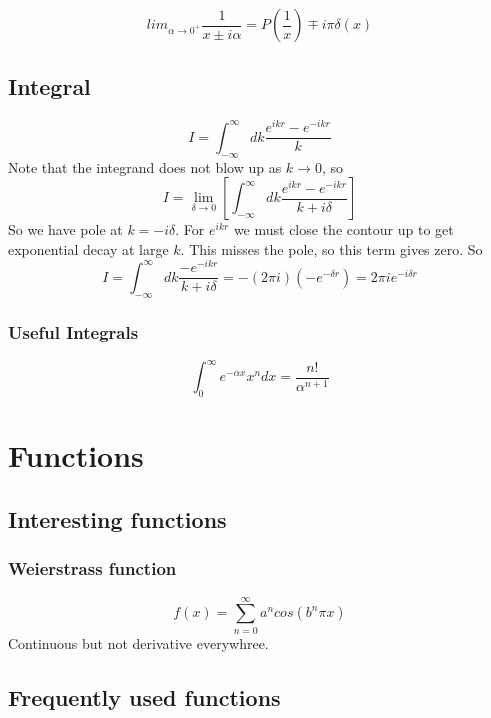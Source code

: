 \begin{equation}
    \displaystyle lim_{\alpha\rightarrow 0^{+}}\frac{1}{x \pm i\alpha} = P\left(\frac{1}{x}\right) \mp i\pi\delta(x)
\end{equation}
\subsection{Integral}
\[
    I=\int_{-\infty}^{\infty}dk\frac{e^{ikr}-e^{-ikr}}{k}
    \]
Note that the integrand does not blow up as $k \rightarrow 0$, so
\[
    I=\displaystyle\lim_{\delta\rightarrow{0}}\left[\int_{-\infty}^{\infty}dk\frac{e^{ikr}-e^{-ikr}}{k+i\delta}\right]
    \]
So we have pole at $k = -i\delta$. For $e^{ikr}$ we must close the contour
up to get exponential decay at large $\mathit{k}$. This misses the pole, so
this term gives zero. So
\[
    I=\int_{-\infty}^{\infty}dk\frac{-e^{-ikr}}{k+i\delta}=-(2\pi{i})(-e^{-\delta{r}})=2\pi{i}e^{-i\delta{r}}
    \]

\subsubsection{Useful Integrals}
\[
    \int_0^\infty e^{-\alpha x}x^ndx = \frac{n!}{\alpha^{n+1}} 
    \]
\section{Functions}

\subsection{Interesting functions}
\subsubsection{Weierstrass function}
\begin{equation}
    f(x) = \sum_{n=0}^{\infty}a^{n}cos(b^{n}\pi x)
\end{equation}
Continuous but not derivative everywhree.


\subsection{Frequently used functions}

